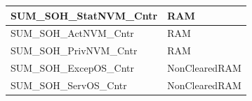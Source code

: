\begin{longtable}{|l|l|}
\begin{minipage}{0.47\linewidth}\raggedright\vspace{.75ex}SUM\_SOH\_StatNVM\_Cntr\vspace{.75ex}\end{minipage} & \begin{minipage}{0.47\linewidth}\raggedright\vspace{.75ex}RAM\vspace{.75ex}\end{minipage}\\\hline
\begin{minipage}{0.47\linewidth}\raggedright\vspace{.75ex}SUM\_SOH\_ActNVM\_Cntr\vspace{.75ex}\end{minipage} & \begin{minipage}{0.47\linewidth}\raggedright\vspace{.75ex}RAM\vspace{.75ex}\end{minipage}\\\hline
\begin{minipage}{0.47\linewidth}\raggedright\vspace{.75ex}SUM\_SOH\_PrivNVM\_Cntr\vspace{.75ex}\end{minipage} & \begin{minipage}{0.47\linewidth}\raggedright\vspace{.75ex}RAM\vspace{.75ex}\end{minipage}\\\hline
\begin{minipage}{0.47\linewidth}\raggedright\vspace{.75ex}SUM\_SOH\_ExcepOS\_Cntr\vspace{.75ex}\end{minipage} & \begin{minipage}{0.47\linewidth}\raggedright\vspace{.75ex}NonClearedRAM\vspace{.75ex}\end{minipage}\\\hline
\begin{minipage}{0.47\linewidth}\raggedright\vspace{.75ex}SUM\_SOH\_ServOS\_Cntr\vspace{.75ex}\end{minipage} & \begin{minipage}{0.47\linewidth}\raggedright\vspace{.75ex}NonClearedRAM\vspace{.75ex}\end{minipage}\\\hline

\end{longtable}

